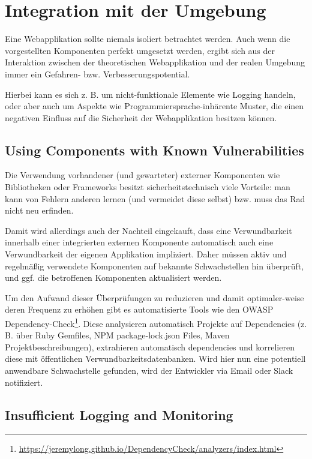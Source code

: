 \chapter{Integration mit der Umgebung}

Eine Webapplikation sollte niemals isoliert betrachtet werden. Auch wenn die vorgestellten Komponenten perfekt umgesetzt werden, ergibt sich aus der Interaktion zwischen der theoretischen Webapplikation und der realen Umgebung immer ein Gefahren- bzw. Verbesserungspotential.

Hierbei kann es sich z. B. um nicht-funktionale Elemente wie Logging handeln, oder aber auch um Aspekte wie Programmiersprache-inhärente Muster, die einen negativen Einfluss auf die Sicherheit der Webapplikation besitzen können.

\section{Using Components with Known Vulnerabilities}

Die Verwendung vorhandener (und gewarteter) externer Komponenten wie Bibliotheken oder Frameworks besitzt sicherheitstechnisch viele Vorteile: man kann von Fehlern anderen lernen (und vermeidet diese selbst) bzw. muss das Rad nicht neu erfinden.

Damit wird allerdings auch der Nachteil eingekauft, dass eine Verwundbarkeit innerhalb einer integrierten externen Komponente automatisch auch eine Verwundbarkeit der eigenen Applikation impliziert. Daher müssen aktiv und regelmäßig verwendete Komponenten auf bekannte Schwachstellen hin überprüft, und ggf. die betroffenen Komponenten aktualisiert werden.

Um den Aufwand dieser Überprüfungen zu reduzieren und damit optimaler-weise deren Frequenz zu erhöhen gibt es automatisierte Tools wie den OWASP Dependency-Check\footnote{\url{https://jeremylong.github.io/DependencyCheck/analyzers/index.html}}. Diese analysieren automatisch Projekte auf Dependencies (z. B. über Ruby Gemfiles, NPM package-lock.json Files, Maven Projektbeschreibungen), extrahieren automatisch dependencies und korrelieren diese mit öffentlichen Verwundbarkeitsdatenbanken. Wird hier nun eine potentiell anwendbare Schwachstelle gefunden, wird der Entwickler via Email oder Slack notifiziert.

\section{Insufficient Logging and Monitoring}

